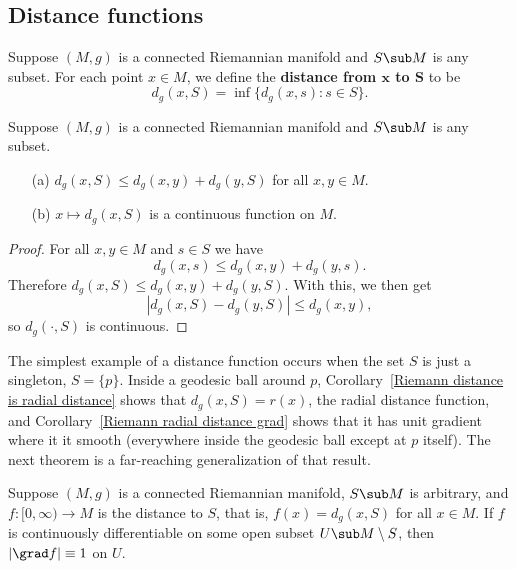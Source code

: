 \subsection{Distance functions}
Suppose $(M,g)$ is a connected Riemannian manifold and $S\sub M$ is any subset. For each point $x\in M$, we define the \textbf{distance from $\bm{x}$ to $\bm{S}$} to be
\[d_g(x,S)=\inf\{d_g(x,s):s\in S\}.\]
\begin{lemma}\label{Riemann distance function lem}
Suppose $(M,g)$ is a connected Riemannian manifold and $S\sub M$ is any subset.
\begin{itemize}
\item[(a)] $d_g(x,S)\leq d_g(x,y)+d_g(y,S)$ for all $x,y\in M$.
\item[(b)] $x\mapsto d_g(x,S)$ is a continuous function on $M$.
\end{itemize}
\end{lemma}
\begin{proof}
For all $x,y\in M$ and $s\in S$ we have
\[d_g(x,s)\leq d_g(x,y)+d_g(y,s).\]
Therefore $d_g(x,S)\leq d_g(x,y)+d_g(y,S)$. With this, we then get
\[|d_g(x,S)-d_g(y,S)|\leq d_g(x,y),\]
so $d_g(\cdot, S)$ is continuous.
\end{proof}
The simplest example of a distance function occurs when the set $S$ is just a singleton, $S=\{p\}$. Inside a geodesic ball around $p$, Corollary~\ref{Riemann distance is radial distance} 
shows that $d_g(x,S)=r(x)$, the radial distance function, and Corollary~\ref{Riemann radial distance grad} shows that it has unit gradient where it it smooth (everywhere 
inside the geodesic ball except at $p$ itself). The next theorem is a far-reaching generalization of that result.
\begin{theorem}\label{Riemann distance function grad}
Suppose $(M,g)$ is a connected Riemannian manifold, $S\sub M$ is arbitrary, and $f:[0,\infty)\to M$ is the distance to $S$, that is, $f(x)=d_g(x,S)$ for all $x\in M$. If 
$f$ is continuously differentiable on some open subset $U\sub M\setminus S$, then $|\grad f|\equiv 1$ on $U$.
\end{theorem}

